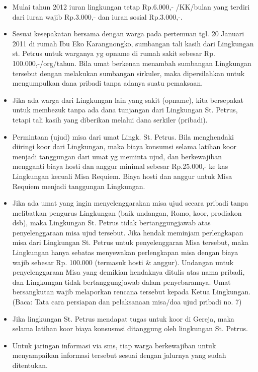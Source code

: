 \documentclass{article}
\begin{document}
\begin{itemize}
\item Mulai tahun 2012 iuran lingkungan tetap Rp.6.000,- /KK/bulan yang
terdiri dari iuran wajib Rp.3.000,- dan iuran sosial Rp.3.000,-.
\item Sesuai kesepakatan bersama dengan warga pada pertemuan tgl. 20
Januari 2011 di rumah Ibu Eko Karangnongko, sumbangan tali kasih dari
Lingkungan st. Petrus untuk warganya yg opname di rumah sakit sebesar
Rp. 100.000,-/org/tahun. Bila umat berkenan menambah sumbangan
Lingkungan tersebut dengan melakukan sumbangan sirkuler, maka
dipersilahkan untuk mengumpulkan dana pribadi tanpa adanya suatu
pemaksaan. 
\item Jika ada warga dari Lingkungan lain yang sakit (opname), kita
bersepakat untuk membezuk tanpa ada dana tunjangan dari Lingkungan St.
Petrus, tetapi tali kasih yang diberikan melalui dana serkiler
(pribadi).
\item Permintaan (ujud) misa dari umat Lingk. St. Petrus. Bila
menghendaki diiringi koor dari Lingkungan, maka biaya konsumsi selama
latihan koor menjadi tanggungan dari umat yg meminta ujud, dan
berkewajiban mengganti biaya hosti dan anggur minimal sebesar
Rp.25.000,- ke kas Lingkungan kecuali Misa Requiem.  Biaya hosti dan
anggur untuk Misa Requiem menjadi tanggungan Lingkungan.
\item Jika ada umat yang ingin menyelenggarakan misa ujud secara pribadi
tanpa melibatkan pengurus Lingkungan (baik undangan, Romo, koor,
prodiakon  dsb), maka Lingkungan St. Petrus tidak bertanggungjawab atas
penyelenggaraan misa ujud tersebut. Jika hendak meminjam perlengkapan
misa dari Lingkungan St. Petrus untuk penyelenggaran Misa tersebut,
maka Lingkungan hanya sebatas menyewakan perlengkapan misa dengan biaya
wajib sebesar Rp. 100.000 (termasuk hosti \& anggur). Undangan untuk
penyelenggaraan Misa yang demikian hendaknya ditulis atas nama pribadi,
dan Lingkungan tidak bertanggungjawab dalam penyebarannya. Umat
bersangkutan wajib melaporkan rencana tersebut kepada Ketua Lingkungan.
(Baca: Tata cara persiapan dan pelaksanaan misa/doa ujud pribadi no. 7)
\item Jika lingkungan St. Petrus mendapat tugas untuk koor di Gereja,
maka selama latihan koor biaya konsusmsi ditanggung oleh lingkungan St.
Petrus. 
\item Untuk jaringan informasi via sms, tiap warga berkewajiban untuk
menyampaikan informasi tersebut sesuai dengan jalurnya yang sudah
ditentukan.
\end{itemize}
\end{document}

